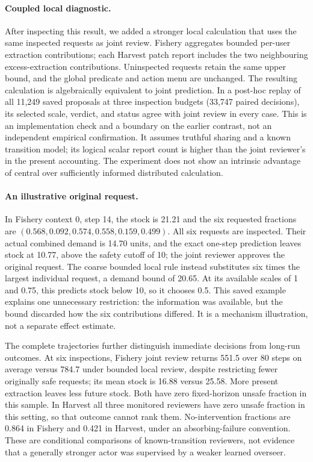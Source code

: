 \documentclass[10pt]{article}
\begin{document}
\paragraph{Coupled local diagnostic.}
After inspecting this result, we added a stronger local calculation that uses
the same inspected requests as joint review. Fishery aggregates bounded
per-user extraction contributions; each Harvest patch report includes the
two neighbouring excess-extraction contributions. Uninspected requests retain
the same upper bound, and the global predicate and action menu are unchanged.
The resulting calculation is algebraically equivalent to joint prediction.
In a post-hoc replay of all 11,249 saved proposals at three inspection budgets
(33,747 paired decisions), its selected scale, verdict, and status agree with
joint review in every case. This is an implementation check and a boundary on
the earlier contrast, not an independent empirical confirmation. It assumes
truthful sharing and a known transition model; its logical scalar report count
is higher than the joint reviewer's in the present accounting. The experiment
does not show an intrinsic advantage of central over sufficiently informed
distributed calculation.

\paragraph{An illustrative original request.}
In Fishery context 0, step 14, the stock is 21.21 and the six requested
fractions are $(0.568,0.092,0.574,0.558,0.159,0.499)$. All six requests are
inspected. Their actual combined demand is 14.70 units, and the exact
one-step prediction leaves stock at 10.77, above the safety cutoff of 10;
the joint reviewer approves the original request. The coarse bounded local
rule instead substitutes six times the largest individual request, a demand
bound of 20.65. At its available scales of 1 and 0.75, this predicts stock
below 10, so it chooses 0.5. This saved example explains one unnecessary
restriction: the information was available, but the bound discarded how the
six contributions differed. It is a mechanism illustration, not a separate
effect estimate.

The complete trajectories further distinguish immediate decisions from
long-run outcomes. At six inspections, Fishery joint review returns 551.5
over 80 steps on average versus 784.7 under bounded local review, despite
restricting fewer originally safe requests; its mean stock is 16.88 versus
25.58. More present extraction leaves less future stock. Both have zero
fixed-horizon unsafe fraction in this sample. In Harvest all three monitored
reviewers have zero unsafe fraction in this setting, so that outcome cannot
rank them. No-intervention fractions are 0.864 in Fishery and 0.421 in Harvest,
under an absorbing-failure convention. These are conditional comparisons of
known-transition reviewers, not evidence that a generally stronger actor was
supervised by a weaker learned overseer.
\end{document}
